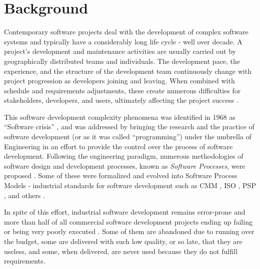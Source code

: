 \newpage
%
%
\section{Background}\label{section_background}
Contemporary software projects deal with the development of complex software systems and typically have 
a considerably long life cycle - well over decade.
A project's development and maintenance activities are usually carried out by geographically 
distributed teams and individuals. The development pace, the experience, and the structure of the 
development team continuously change with project progression as developers joining and leaving. 
When combined with schedule and requirements adjustments, these create numerous difficulties 
for stakeholders, developers, and users, ultimately affecting the project success \cite{citeulike:2207657}. 

This software development complexity phenomena was identified in 1968 as ``Software crisis'' 
\cite{naur_crisis_68}, and was addressed by bringing the research and the practice of software development 
(or as it was called ``programming'') under the umbrella of Engineering in an effort to provide 
the control over the process of software development. 
Following the engineering paradigm, numerous methodologies of software design and development 
processes, known as \textit{Software Processes}, were proposed \cite{citeulike:10002165}.
Some of these were formalized and evolved into Software Process Models - industrial standards for 
software development such as CMM \cite{citeulike:9962021}, ISO \cite{iso-standard}, 
PSP \cite{citeulike:8347315}, and others \cite{citeulike:5043104}. 

In spite of this effort, industrial software  development remains error-prone and more than half of all 
commercial software development projects ending up failing or being very poorly executed \cite{chaos2006}.
Some of them are abandoned due to running over the budget, some are delivered with such low quality, 
or so late, that they are useless, and some, when delivered, are never used because they do not 
fulfill requirements. 

